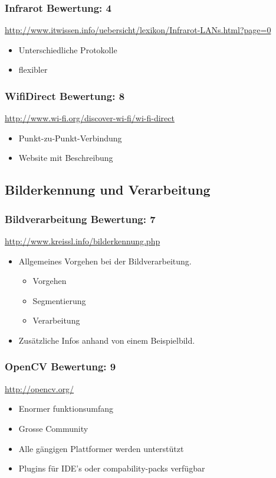 \subsubsection{Infrarot  \hfill Bewertung: 4}
\url{http://www.itwissen.info/uebersicht/lexikon/Infrarot-LANs.html?page=0}
\begin{itemize}
    \item Unterschiedliche Protokolle
    \item flexibler
\end{itemize}

\subsubsection{WifiDirect  \hfill Bewertung: 8}
\url{http://www.wi-fi.org/discover-wi-fi/wi-fi-direct}
\begin{itemize}
    \item Punkt-zu-Punkt-Verbindung
    \item Website mit Beschreibung
\end{itemize}

\subsection{Bilderkennung und Verarbeitung}

\subsubsection{Bildverarbeitung  \hfill Bewertung: 7}
\url{http://www.kreissl.info/bilderkennung.php}
\begin{itemize}
    \item Allgemeines Vorgehen bei der Bildverarbeitung. 
    \begin{itemize}
        \item Vorgehen
        \item Segmentierung
        \item Verarbeitung
    \end{itemize}
    \item Zusätzliche Infos anhand von einem Beispielbild.
\end{itemize}

\subsubsection{OpenCV  \hfill Bewertung: 9}
\url{http://opencv.org/ }
\begin{itemize}
    \item Enormer funktionsumfang
    \item Grosse Community
    \item Alle gängigen Plattformer werden unterstützt
    \item Plugins für IDE’s oder compability-packs verfügbar
\end{itemize}

